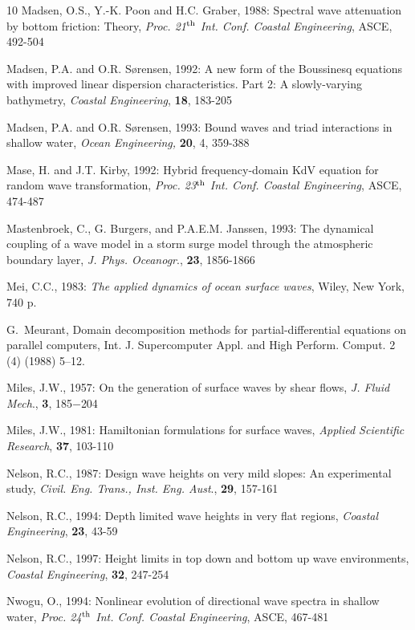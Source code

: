 \documentclass[12pt]{book}
\begin{document}
\begin{thebibliography}{10}
Madsen, O.S., Y.-K. Poon and H.C. Graber, 1988: Spectral wave attenuation by bottom friction: Theory,
{\it Proc. 21$^{{\rm th}}$ Int. Conf. Coastal Engineering}, ASCE, 492-504

Madsen, P.A. and O.R. S{\o}rensen, 1992: A new form of the Boussinesq equations with improved linear
dispersion characteristics. Part 2: A slowly-varying bathymetry, {\it Coastal Engineering}, {\bf 18}, 183-205

Madsen, P.A. and O.R. S{\o}rensen, 1993: Bound waves and triad interactions in shallow water, {\it Ocean
Engineering,} {\bf 20}, 4, 359-388

Mase, H. and J.T. Kirby, 1992: Hybrid frequency-domain KdV equation for random wave transformation,
{\it Proc. 23$^{{\rm th}}$ Int. Conf. Coastal Engineering}, ASCE, 474-487

Mastenbroek, C., G. Burgers, and P.A.E.M. Janssen, 1993: The dynamical coupling of a wave model in
a storm surge model through the atmospheric boundary layer, {\it J. Phys. Oceanogr}., {\bf 23}, 1856-1866

Mei, C.C., 1983: {\it The applied dynamics of ocean surface waves}, Wiley, New York, 740 p.

G.~Meurant, Domain decomposition methods for partial-differential equations on
  parallel computers, Int. J. Supercomputer Appl. and High Perform. Comput. 2
  (4) (1988) 5--12.

Miles, J.W., 1957: On the generation of surface waves by shear flows, {\it J. Fluid Mech}., {\bf 3}, 185$-$204

Miles, J.W., 1981: Hamiltonian formulations for surface waves, {\it Applied Scientific Research}, {\bf 37}, 103-110

Nelson, R.C., 1987: Design wave heights on very mild slopes: An experimental study, {\it Civil. Eng. Trans.,
Inst. Eng. Aust}., {\bf 29}, 157-161

Nelson, R.C., 1994: Depth limited wave heights in very flat regions, {\it Coastal Engineering}, {\bf 23}, 43-59

Nelson, R.C., 1997: Height limits in top down and bottom up wave environments, {\it Coastal Engineering},
{\bf 32}, 247-254

Nwogu, O., 1994: Nonlinear evolution of directional wave spectra in shallow water, {\it Proc. 24$^{{\rm th}}$ Int. Conf.
Coastal Engineering}, ASCE, 467-481


\end{thebibliography}
\end{document}
